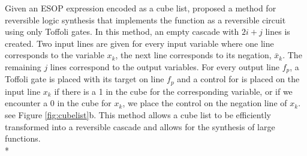 Given an ESOP expression encoded as a cube list, \cite{Thornton2007} proposed a 
method for reversible logic synthesis that implements the function as a reversible circuit using only Toffoli gates. In this method, an empty cascade with $2i + j$ lines is created. Two input lines are given for every input 
variable where one line corresponds to the variable $x_{k}$, the next line corresponds to its negation, $\bar{x}_{k}$. The remaining $j$ lines correspond to the output variables. For every output line $f_{p}$, a Toffoli gate 
is placed with its target on line $f_{p}$ and a control for is placed on the input line $x_{k}$ if there is a 1 in the cube for the corresponding variable, or if we encounter a 0 in the
cube for $x_{k}$, we place the control on the negation line of $x_{k}$. see Figure \ref{fig:cubelist}b. This method allows a cube list to be efficiently transformed into a reversible cascade and allows for the synthesis of large functions. \\*


